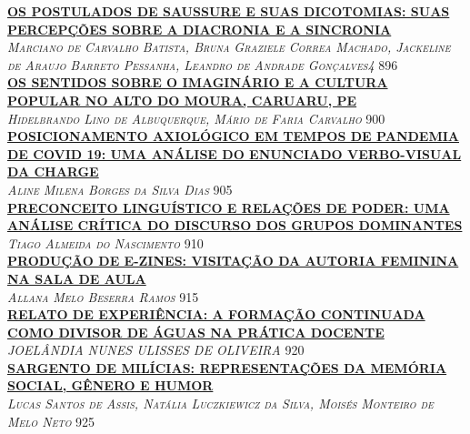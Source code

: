 \noindent \textsc{\hyperlink{trabalhos/250287.pdf.1}{\textbf{OS POSTULADOS DE SAUSSURE E SUAS DICOTOMIAS: SUAS PERCEPÇÕES SOBRE A DIACRONIA E A SINCRONIA}}}\\ 
\noindent \textsc{\textit{Marciano de Carvalho Batista, Bruna Graziele Correa Machado, Jackeline de Araujo Barreto Pessanha, Leandro de Andrade Gonçalves4}} \hfill 896\\ 

\noindent \textsc{\hyperlink{trabalhos/249120.pdf.1}{\textbf{OS SENTIDOS SOBRE O IMAGINÁRIO E A CULTURA POPULAR NO ALTO DO MOURA, CARUARU, PE}}}\\ 
\noindent \textsc{\textit{Hidelbrando Lino de Albuquerque, Mário de Faria Carvalho}} \hfill 900\\ 

\noindent \textsc{\hyperlink{trabalhos/250328.pdf.1}{\textbf{POSICIONAMENTO AXIOLÓGICO EM TEMPOS DE PANDEMIA DE COVID 19: UMA ANÁLISE DO ENUNCIADO VERBO-VISUAL DA CHARGE}}}\\ 
\noindent \textsc{\textit{Aline Milena Borges da Silva Dias}} \hfill 905\\ 

\noindent \textsc{\hyperlink{trabalhos/251208.pdf.1}{\textbf{PRECONCEITO LINGUÍSTICO E RELAÇÕES DE PODER: UMA ANÁLISE CRÍTICA DO DISCURSO DOS GRUPOS DOMINANTES                                                 }}}\\ 
\noindent \textsc{\textit{Tiago Almeida do Nascimento}} \hfill 910\\ 

\noindent \textsc{\hyperlink{trabalhos/250092.pdf.1}{\textbf{PRODUÇÃO DE E-ZINES: VISITAÇÃO DA AUTORIA FEMININA NA SALA DE AULA}}}\\ 
\noindent \textsc{\textit{Allana Melo Beserra Ramos}} \hfill 915\\ 

\noindent \textsc{\hyperlink{trabalhos/249735.pdf.1}{\textbf{RELATO DE EXPERIÊNCIA: A FORMAÇÃO CONTINUADA COMO DIVISOR DE ÁGUAS NA PRÁTICA DOCENTE}}}\\ 
\noindent \textsc{\textit{JOELÂNDIA NUNES ULISSES DE OLIVEIRA}} \hfill 920\\ 

\noindent \textsc{\hyperlink{trabalhos/249370.pdf.1}{\textbf{SARGENTO DE MILÍCIAS: REPRESENTAÇÕES DA MEMÓRIA SOCIAL, GÊNERO E HUMOR}}}\\ 
\noindent \textsc{\textit{Lucas Santos de Assis, Natália Luczkiewicz da Silva, Moisés Monteiro de Melo Neto}} \hfill 925\\ 


